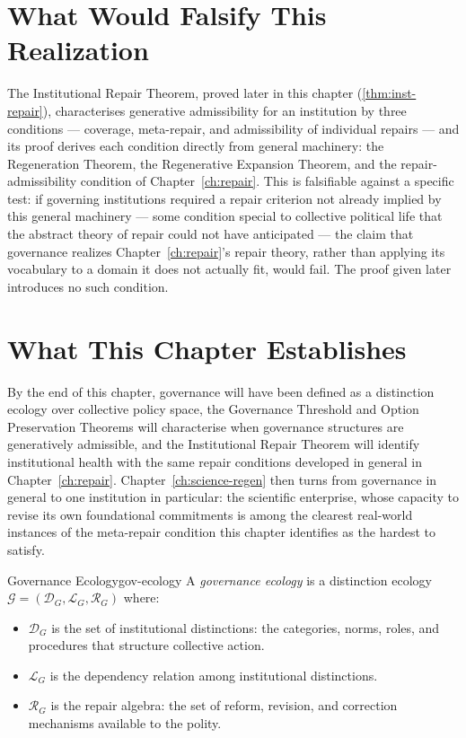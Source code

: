 \documentclass[12pt,twoside,openright]{book}
\begin{document}
\section{What Would Falsify This Realization}
\label{sec:ch28-falsifiability}

The Institutional Repair Theorem, proved later in this
chapter (\cref{thm:inst-repair}), characterises generative
admissibility for an institution by three conditions ---
coverage, meta-repair, and admissibility of individual
repairs --- and its proof derives each condition directly
from general machinery: the Regeneration Theorem, the
Regenerative Expansion Theorem, and the repair-admissibility
condition of Chapter~\ref{ch:repair}. This is falsifiable
against a specific test: if governing institutions required a
repair criterion not already implied by this general
machinery --- some condition special to collective political
life that the abstract theory of repair could not have
anticipated --- the claim that governance realizes
Chapter~\ref{ch:repair}'s repair theory, rather than applying
its vocabulary to a domain it does not actually fit, would
fail. The proof given later introduces no such condition.

\section{What This Chapter Establishes}
\label{sec:ch28-preview}

By the end of this chapter, governance will have been defined
as a distinction ecology over collective policy space, the
Governance Threshold and Option Preservation Theorems will
characterise when governance structures are generatively
admissible, and the Institutional Repair Theorem will identify
institutional health with the same repair conditions developed
in general in Chapter~\ref{ch:repair}. Chapter~\ref{ch:science-regen}
then turns from governance in general to one institution in
particular: the scientific enterprise, whose capacity to
revise its own foundational commitments is among the clearest
real-world instances of the meta-repair condition this chapter
identifies as the hardest to satisfy.

\begin{definition}{Governance Ecology}{gov-ecology}
  A \emph{governance ecology} is a distinction ecology
  $\mathcal{G} = (\mathcal{D}_G, \mathcal{L}_G,
  \mathcal{R}_G)$ where:
  \begin{itemize}[nosep]
    \item $\mathcal{D}_G$ is the set of institutional
          distinctions: the categories, norms, roles,
          and procedures that structure collective action.
    \item $\mathcal{L}_G$ is the dependency relation
          among institutional distinctions.
    \item $\mathcal{R}_G$ is the repair algebra:
          the set of reform, revision, and correction
          mechanisms available to the polity.
  \end{itemize}
\end{definition}
\end{document}
